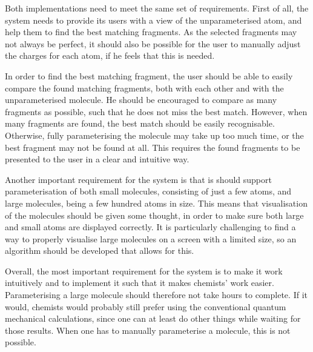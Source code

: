 Both implementations need to meet the same set of requirements. First of all, the system needs to provide its users with a view of the unparameterised atom, and help them to find the best matching fragments. As the selected fragments may not always be perfect, it should also be possible for the user to manually adjust the charges for each atom, if he feels that this is needed.

In order to find the best matching fragment, the user should be able to easily compare the found matching fragments, both with each other and with the unparameterised molecule. He should be encouraged to compare as many fragments as possible, such that he does not miss the best match. However, when many fragments are found, the best match should be easily recognisable. Otherwise, fully parameterising the molecule may take up too much time, or the best fragment may not be found at all. This requires the found fragments to be presented to the user in a clear and intuitive way.

Another important requirement for the system is that is should support parameterisation of both small molecules, consisting of just a few atoms, and large molecules, being a few hundred atoms in size. This means that visualisation of the molecules should be given some thought, in order to make sure both large and small atoms are displayed correctly. It is particularly challenging to find a way to properly visualise large molecules on a screen with a limited size, so an algorithm should be developed that allows for this. %

Overall, the most important requirement for the system is to make it work intuitively and to implement it such that it makes chemists' work easier. Parameterising a large molecule should therefore not take hours to complete. If it would, chemists would probably still prefer using the conventional quantum mechanical calculations, since one can at least do other things while waiting for those results. When one has to manually parameterise a molecule, this is not possible.
